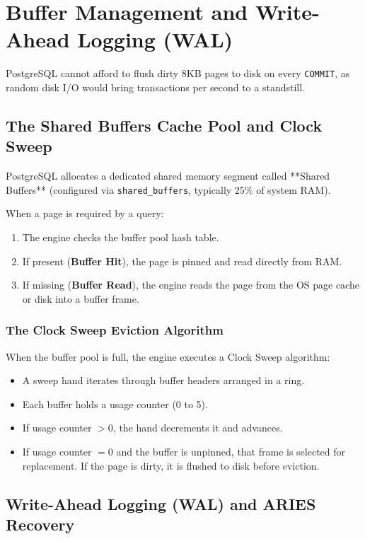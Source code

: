 \section{Buffer Management and Write-Ahead Logging (WAL)}

PostgreSQL cannot afford to flush dirty 8KB pages to disk on every \texttt{COMMIT}, as random disk I/O would bring transactions per second to a standstill.

\subsection{The Shared Buffers Cache Pool and Clock Sweep}

PostgreSQL allocates a dedicated shared memory segment called **Shared Buffers** (configured via \texttt{shared\_buffers}, typically 25\% of system RAM).

When a page is required by a query:
\begin{enumerate}[leftmargin=15pt]
  \item The engine checks the buffer pool hash table.
  \item If present (\textbf{Buffer Hit}), the page is pinned and read directly from RAM.
  \item If missing (\textbf{Buffer Read}), the engine reads the page from the OS page cache or disk into a buffer frame.
\end{enumerate}

\subsubsection{The Clock Sweep Eviction Algorithm}
When the buffer pool is full, the engine executes a Clock Sweep algorithm:
\begin{itemize}[leftmargin=15pt]
  \item A sweep hand iterates through buffer headers arranged in a ring.
  \item Each buffer holds a usage counter (0 to 5).
  \item If usage counter $> 0$, the hand decrements it and advances.
  \item If usage counter $= 0$ and the buffer is unpinned, that frame is selected for replacement. If the page is dirty, it is flushed to disk before eviction.
\end{itemize}

\subsection{Write-Ahead Logging (WAL) and ARIES Recovery}

